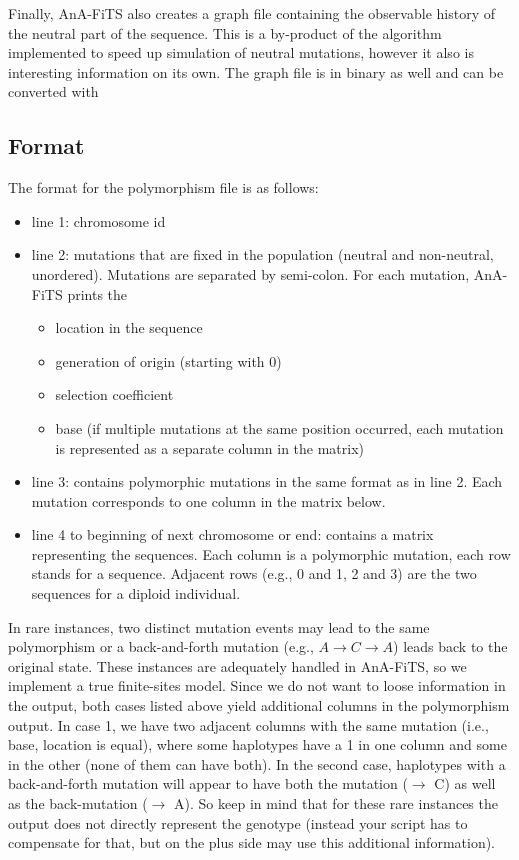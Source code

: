 \documentclass{scrartcl}
\newcommand{\console}[1]{\newline {\footnotesize \texttt{\$ #1}} \newline}
\begin{document}
Finally, AnA-FiTS also creates a graph file containing the observable
history of the neutral part of the sequence. This is a by-product of
the algorithm implemented to speed up simulation of neutral mutations,
however it also is interesting information on its own. The graph file
is in binary as well and can be converted with \console{./convertGraph ./anafits\_graph.myRun}


\subsection{Format}

The format for the polymorphism file is as follows: 
\begin{itemize}
\item line 1: chromosome id 
\item line 2: mutations that are fixed in the population (neutral and non-neutral, unordered).
  Mutations are separated by semi-colon. For each mutation, AnA-FiTS
  prints the 
  \begin{itemize}
  \item location in the sequence
  \item generation of origin (starting  with 0)
  \item selection coefficient 
  \item base (if multiple mutations at the same position occurred,
    each mutation is represented as a separate column in the matrix)
  \end{itemize}
\item line 3: contains polymorphic mutations in the same format as in
  line 2. Each mutation corresponds to one column in the matrix
  below. 
\item line 4 to beginning of next chromosome or end: contains a matrix
  representing the sequences. Each column is a polymorphic mutation,
  each row stands for a sequence. Adjacent rows (e.g., 0 and 1, 2 and
  3) are the two sequences for a diploid individual. 
\end{itemize}

In rare instances, two distinct mutation events may lead to the same
polymorphism or a back-and-forth mutation (e.g., $A \rightarrow C
\rightarrow A$) leads back to the original state. These instances are
adequately handled in AnA-FiTS, so we implement a true finite-sites
model. Since we do not want to loose information in the output, both
cases listed above yield additional columns in the polymorphism
output. In case 1, we have two adjacent columns with the same mutation
(i.e., base, location is equal), where some haplotypes have a 1 in one
column and some in the other (none of them can have both). In the
second case, haplotypes with a back-and-forth mutation will appear to
have both the mutation ($\rightarrow$ C) as well as the back-mutation
($\rightarrow$ A). So keep in mind that for these rare instances the
output does not directly represent the genotype (instead your script
has to compensate for that, but on the plus side may use this
additional information).
\end{document}
